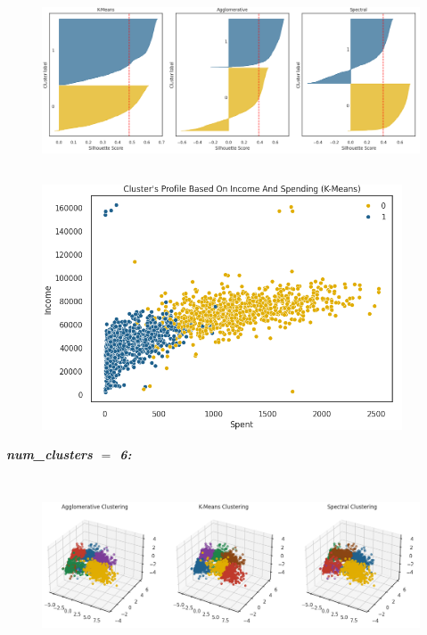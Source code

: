 \documentclass[11pt]{article}
\begin{document}
\begin{figure}[H]
\centering
\includegraphics[width=13.43cm,height=5.2cm]{./images/image18.png}
\end{figure}


\begin{figure}[H]
\centering
\includegraphics[width=10.7cm,height=7.26cm]{./images/image28.png}
\end{figure}


\vspace{3\baselineskip}
\begin{center}
\textbf{\textit{num\_clusters $=$ 6:}}
\end{center}


\vspace{1\baselineskip}
\begin{figure}[H]
\centering
\includegraphics[width=15.92cm,height=5.29cm]{./images/image8.png}
\end{figure}
\end{document}

